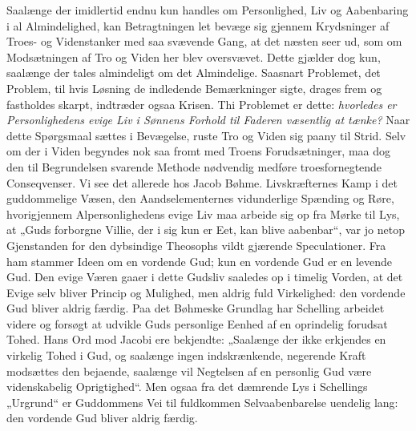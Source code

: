 \documentclass[12pt]{book}
\begin{document}
Saalænge der imidlertid endnu kun handles om Personlighed, Liv og
Aabenbaring i al Almindelighed, kan Betragtningen let bevæge sig
gjennem Krydsninger af Troes- og Videnstanker med saa svævende Gang,
at det næsten seer ud, som om Modsætningen af Tro og Viden
her blev oversvævet. Dette gjælder dog kun, saalænge der tales
almindeligt om det Almindelige. Saasnart Problemet, det Problem, til
hvis Løsning de indledende Bemærkninger sigte, drages frem og
fastholdes skarpt, indtræder ogsaa Krisen. Thi Problemet er dette:
\emph{hvorledes er Personlighedens evige Liv i Sønnens Forhold til
Faderen væsentlig at tænke?} Naar dette Spørgsmaal sættes i
Bevægelse, ruste Tro og Viden sig paany til Strid. Selv om der i
Viden begyndes nok saa fromt med Troens Forudsætninger, maa dog den
til Begrundelsen svarende Methode nødvendig medføre
troesfornegtende Conseqvenser. Vi see det allerede hos Jacob Bøhme.
Livskræfternes Kamp i det guddommelige Væsen, den Aandselementernes
vidunderlige Spænding og Røre, hvorigjennem Alpersonlighedens evige
Liv maa arbeide sig op fra Mørke til Lys, at „Guds forborgne Villie,
der i sig kun er Eet, kan blive aabenbar“, var jo netop Gjenstanden
for den dybsindige Theosophs vildt gjærende Speculationer. Fra ham
stammer Ideen om en vordende Gud; kun en vordende Gud er en levende
Gud. Den evige Væren gaaer i dette Gudsliv saaledes op i timelig
Vorden, at det Evige selv bliver Princip og Mulighed, men aldrig
fuld Virkelighed: den vordende Gud bliver aldrig færdig. Paa det
Bøhmeske Grundlag har Schelling arbeidet videre og forsøgt at
udvikle Guds personlige Eenhed af en oprindelig forudsat Tohed. Hans
Ord mod Jacobi ere bekjendte: „Saalænge der ikke erkjendes en
virkelig Tohed i Gud, og saalænge ingen indskrænkende, negerende
Kraft modsættes den bejaende, saalænge vil Negtelsen af en personlig
Gud være videnskabelig Oprigtighed“. Men ogsaa fra det dæmrende Lys
i Schellings „Urgrund“ er Guddommens Vei til fuldkommen
Selvaabenbarelse uendelig lang: den vordende Gud bliver aldrig
færdig.
\end{document}
